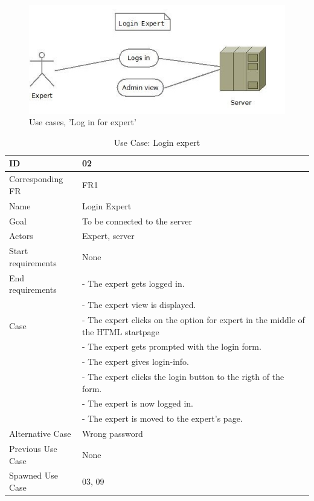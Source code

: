 \begin{figure}[H]
  \centering
    \includegraphics[width=1.0\textwidth]{img/loginexpert.jpg}
  \caption{Use cases, 'Log in for expert'} 
  \label{fig:loginexpert}
\end{figure}


\begin{table}[H]
\begin{tabular}{|l|p{14cm}|} \hline
	\textbf{ID} & \textbf{02}\\ \hline
	Corresponding FR & FR1\\ \hline
	Name & Login Expert\\ \hline
	Goal & To be connected to the server\\ \hline
	Actors & Expert, server\\ \hline
	Start requirements & None\\ \hline
	End requirements & - The expert gets logged in.\\
					 & - The expert view is displayed.\\ \hline
	Case & - The expert clicks on the option for expert in the middle of the HTML startpage\\
			& - The expert gets prompted with the login form. \\
		 	& - The expert gives login-info.\\
			& - The expert clicks the login button to the rigth of the form.\\
			& - The expert is now logged in.\\ 
			& - The expert is moved to the expert's page. \\ \hline
	Alternative Case & Wrong password\\ \hline
	Previous Use Case & None\\ \hline
	Spawned Use Case & 03, 09\\ \hline
\end{tabular}
\caption{Use Case: Login expert}
\label{fig:usecase02table}
\end{table}


